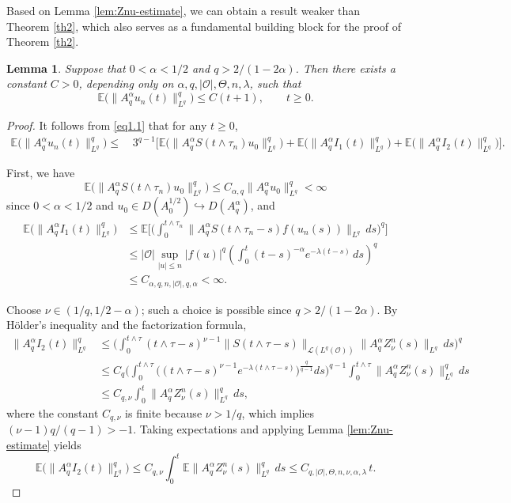 \documentclass[10pt]{article}
\numberwithin{figure}{section}
\numberwithin{equation}{section}
\newtheorem{lemma}[theorem]{Lemma}
\newcommand{\0}{{\theta}}
\def\be{\begin{equation}}
\def\ee{\end{equation}}
\def\a{\alpha}
\begin{document}
Based on Lemma \ref{lem:Znu-estimate}, we can obtain a result weaker than Theorem \ref{th2}, which also serves as a fundamental building block for the proof of Theorem \ref{th2}.
\begin{lemma}\label{lem:stochastic-estimate}
Suppose that $0<\alpha<1/2$ and $q>2/(1-2\alpha)$.  Then there exists a constant $C>0$, depending only on $\alpha,q,|\mathcal O|,\Theta,n,\lambda$, such that
$$
\mathbb{E}\big(\|A_q^\alpha u_n(t)\|_{L^q}^q\big) \le C(t+1),\qquad t\ge0.
$$
\end{lemma}

\begin{proof} It follows from \eqref{eq1.1} that for any $t\ge0$,
\begin{equation*}
\begin{split}
\mathbb{E}\big(\|A_q^\alpha u_n(t)\|_{L^q}^q\big)
\le&\,3^{q-1}\Big[\mathbb{E}\big(\|A_q^\alpha S(t\wedge\tau_n)u_0\|_{L^q}^q\big)
+\mathbb{E}\big(\|A_q^\alpha I_1(t)\|_{L^q}^q\big)
+\mathbb{E}\big(\|A_q^\alpha I_2(t)\|_{L^q}^q\big)\Big].
\end{split}
\end{equation*}

First, we have
\begin{equation}\label{eq2.2}
\mathbb{E}\big(\|A_q^\alpha S(t\wedge\tau_n)u_0\|_{L^q}^q\big)
\le C_{\alpha,q}\|A_q^\alpha u_0\|_{L^q}^q<\infty
\end{equation}
since $0<\alpha<1/2$ and $u_0\in D(A_0^{1/2})\hookrightarrow D(A_q^\alpha)$, and
\begin{equation}\label{eq2.5}
\begin{split}
\mathbb{E}\big(\|A_q^\alpha I_1(t)\|_{L^q}^q\big)
&\le \mathbb{E}\Bigg[\Bigg(\int_0^{t\wedge\tau_n}\|A_q^\alpha S(t\wedge\tau_n-s)f(u_n(s))\|_{L^q}\,ds\Bigg)^q\Bigg] \\
&\le |\mathcal O|\sup_{|u|\le n}|f(u)|^q
\left(\int_0^t(t-s)^{-\alpha}e^{-\lambda(t-s)}\,ds\right)^q \\
&\le C_{\alpha,q,n,|\mathcal O|,q,\a}<\infty.
\end{split}
\end{equation}

Choose $\nu\in(1/q,1/2-\alpha)$; such a choice is possible since $q>2/(1-2\alpha)$. By H\"older's inequality and the factorization formula,
$$
\begin{aligned}
\|A_q^\alpha I_2(t)\|_{L^q}^q
&\le \Bigg(\int_0^{t\wedge\tau}(t\wedge\tau-s)^{\nu-1}
\|S(t\wedge\tau-s)\|_{\mathcal L(L^q(\mathcal O))}
\|A_q^\alpha Z_\nu^n(s)\|_{L^q}\,ds\Bigg)^q \\
&\le C_q\Bigg(\int_0^{t\wedge\tau}\Big((t\wedge\tau-s)^{\nu-1}
e^{-\lambda(t\wedge\tau-s)}\Big)^{\frac{q}{q-1}}ds\Bigg)^{q-1}
\int_0^{t\wedge\tau}\|A_q^\alpha Z_\nu^n(s)\|_{L^q}^q\,ds \\
&\le C_{q,\nu}\int_0^t\|A_q^\alpha Z_\nu^n(s)\|_{L^q}^q\,ds,
\end{aligned}
$$
where the constant $C_{q,\nu}$ is finite because $\nu>1/q$, which implies $(\nu-1)q/(q-1)>-1$. Taking expectations and applying Lemma \ref{lem:Znu-estimate} yields
\be\label{eq3.12}
\mathbb{E}\big(\|A_q^\alpha I_2(t)\|_{L^q}^q\big)
\le C_{q,\nu}\int_0^t \mathbb{E}\|A_q^\alpha Z_\nu^n(s)\|_{L^q}^q\,ds
\le C_{q,|\mathcal O|,\Theta,n,\nu,\alpha,\lambda}\, t.
\ee


\end{proof}
\end{document}
